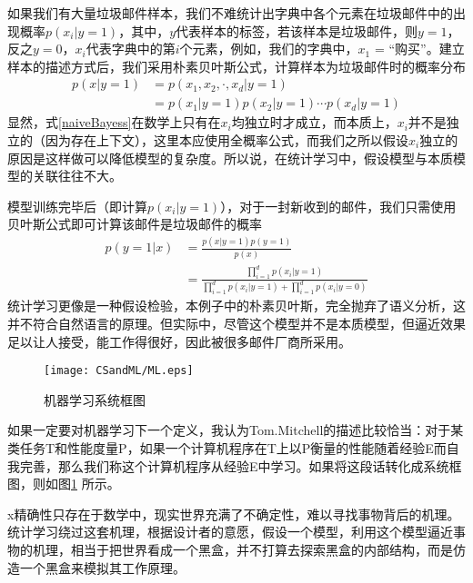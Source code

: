 如果我们有大量垃圾邮件样本，我们不难统计出字典中各个元素在垃圾邮件中的出现概率$p(x_i|y=1)$，其中，$y$代表样本的标签，若该样本是垃圾邮件，则$y=1$，反之$y=0$，$x_i$代表字典中的第$i$个元素，例如，我们的字典中，$x_1$ = “购买”。建立样本的描述方式后，我们采用朴素贝叶斯公式，计算样本为垃圾邮件时的概率分布
\begin{equation}\label{naiveBayess}
\begin{split}
p(x|y=1)&= p(x_1, x_2, \cdot, x_d|y=1)\\
&=p(x_1|y=1)p(x_2|y=1)\cdots p(x_d|y=1)
\end{split}
\end{equation}
显然，式\eqref{naiveBayess}在数学上只有在$x_i$均独立时才成立，而本质上，$x_i$并不是独立的（因为存在上下文），这里本应使用全概率公式，而我们之所以假设$x_i$独立的原因是这样做可以降低模型的复杂度。所以说，在统计学习中，假设模型与本质模型的关联往往不大。

模型训练完毕后（即计算$p(x_i|y=1)$），对于一封新收到的邮件，我们只需使用贝叶斯公式即可计算该邮件是垃圾邮件的概率
\begin{equation}
\begin{split}
p(y=1|x) &= \frac{p(x|y=1)p(y=1)}{p(x)}\\
&=\frac{\prod_{i=1}^d p(x_i|y=1)}{\prod_{i=1}^d p(x_i|y=1) + \prod_{i=1}^d p(x_i|y=0)}
\end{split}
\end{equation}
统计学习更像是一种假设检验，本例子中的朴素贝叶斯，完全抛弃了语义分析，这并不符合自然语言的原理。但实际中，尽管这个模型并不是本质模型，但逼近效果足以让人接受，能工作得很好，因此被很多邮件厂商所采用。

\begin{figure}[htbp]
\centering
\texttt{[image: CSandML/ML.eps]}
\caption{机器学习系统框图}\label{img:ML}
\end{figure}

如果一定要对机器学习下一个定义，我认为Tom.Mitchell的描述比较恰当：对于某类任务T和性能度量P，如果一个计算机程序在T上以P衡量的性能随着经验E而自我完善，那么我们称这个计算机程序从经验E中学习。如果将这段话转化成系统框图，则如图\ref{img:ML} 所示。

x精确性只存在于数学中，现实世界充满了不确定性，难以寻找事物背后的机理。统计学习绕过这套机理，根据设计者的意愿，假设一个模型，利用这个模型逼近事物的机理，相当于把世界看成一个黑盒，并不打算去探索黑盒的内部结构，而是仿造一个黑盒来模拟其工作原理。